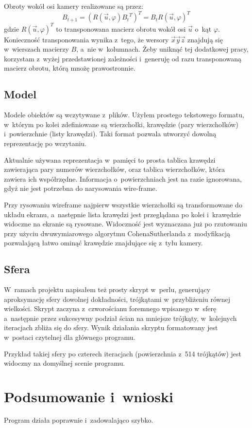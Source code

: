 \documentclass[12pt,a4paper]{article}
\begin{document}
Obroty wokół osi kamery realizowane są przez:
\[ B_{t+1} = \left(R(\overset{\rightarrow}{u},\varphi) {B_t}^T\right)^T
= B_t {R(\overset{\rightarrow}{u},\varphi)}^T \]
gdzie ${R(\overset{\rightarrow}{u},\varphi)}^T$ to transponowana macierz obrotu
wokół osi $\overset{\rightarrow}{u}$ o~kąt $\varphi$.
Konieczność transponowania wynika z~tego, że wersory
$\overset{\rightarrow}{x}\overset{\rightarrow}{y}\overset{\rightarrow}{z}$
znajdują się w~wierszach macierzy $B$, a~nie w~kolumnach.
Żeby uniknąć tej dodatkowej pracy, korzystam z~wyżej przedstawionej zależności
i~generuję od razu transponowaną macierz obrotu, którą mnożę prawostronnie.

\subsection{Model}
Modele obiektów są wczytywane z~plików.
Użyłem prostego tekstowego formatu, w~którym
po kolei zdefiniowane są wierzchołki,
krawędzie (pary wierzchołków) i~powierzchnie (listy krawędzi).
Taki format pozwala utworzyć dowolną reprezentację po wczytaniu.

Aktualnie używana reprezentacja w~pamięci to prosta tablica krawędzi
zawierająca pary numerów wierzchołków, oraz tablica wierzchołków,
która zawiera ich współrzędne.
Informacja o~powierzchniach jest na razie ignorowana, gdyż nie jest
potrzebna do narysowania wire-frame.

Przy rysowaniu wire\dywiz frame najpierw wszystkie wierzchołki są transformowane
do układu ekranu, a~następnie lista krawędzi jest przeglądana po kolei
i~krawędzie widoczne na ekranie są rysowane.
Widoczność jest wyznaczana już po rzutowaniu przy użyciu dwuwymiarowego
algorytmu Cohena\dywiz Sutherlanda z~modyfikacją pozwalającą łatwo ominąć
krawędzie znajdujące się z~tyłu kamery.

\subsection{Sfera}
W~ramach projektu napisałem też prosty skrypt w~perlu,
generujący aproksymację sfery dowolnej dokładności,
trójkątami w~przybliżeniu równej wielkości.
Skrypt zaczyna z~czworościanu foremnego wpisanego w~sferę
a~następnie przez sukcesywny podział ścian na mniejsze trójkąty,
w~kolejnych iteracjach zbliża się do sfery.
Wynik działania skryptu formatowany jest w~postaci czytelnej
dla głównego programu.

Przykład takiej sfery po czterech iteracjach (powierzchnia z~514 trójkątów)
jest widoczny na domyślnej scenie programu.

\section{Podsumowanie i~wnioski}

Program działa poprawnie i~zadowalająco szybko.
\end{document}
